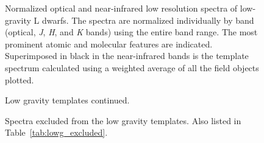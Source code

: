 \documentclass[12pt,preprint]{aastex}
\begin{document}
\begin{figure}
	\caption{Normalized optical and near-infrared low resolution spectra of low-gravity L
dwarfs. The spectra are normalized individually by band (optical, \emph{J}, \emph{H}, and \emph{K} bands)
using the entire band range. The most prominent atomic and molecular features are indicated. Superimposed in black in the near-infrared
bands is the template spectrum calculated using a weighted average of all the
field objects plotted. }
	\label{fig:gamma_templates}
\end{figure}

\begin{figure}
	\caption{Low gravity templates continued.}
\end{figure}

\begin{figure}
	\caption{Spectra excluded from the low gravity templates. Also listed in Table~\ref{tab:lowg_excluded}.}
	\label{fig:lowg_excluded}
\end{figure}

\end{document}
